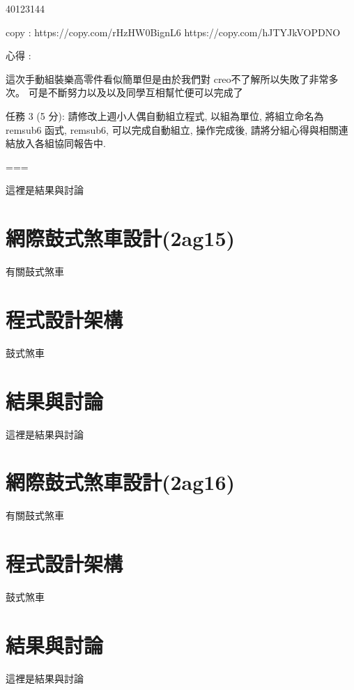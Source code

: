 \documentclass[]{article}
\begin{document}
40123144

copy : https://copy.com/rHzHW0BignL6 https://copy.com/hJTYJkVOPDNO

心得 :

這次手動組裝樂高零件看似簡單但是由於我們對
creo不了解所以失敗了非常多次。
可是不斷努力以及以及同學互相幫忙便可以完成了

任務 3 (5 分): 請修改上週小人偶自動組立程式, 以組為單位, 將組立命名為
remsub6 函式, remsub6, 可以完成自動組立, 操作完成後,
請將分組心得與相關連結放入各組協同報告中.

===

這裡是結果與討論

\section{網際鼓式煞車設計(2ag15)}\label{ux7db2ux969bux9f13ux5f0fux715eux8ecaux8a2dux8a082ag15}

有關鼓式煞車

\section{程式設計架構}\label{ux7a0bux5f0fux8a2dux8a08ux67b6ux69cb-3}

鼓式煞車

\section{結果與討論}\label{ux7d50ux679cux8207ux8a0eux8ad6-3}

這裡是結果與討論

\section{網際鼓式煞車設計(2ag16)}\label{ux7db2ux969bux9f13ux5f0fux715eux8ecaux8a2dux8a082ag16}

有關鼓式煞車

\section{程式設計架構}\label{ux7a0bux5f0fux8a2dux8a08ux67b6ux69cb-4}

鼓式煞車

\section{結果與討論}\label{ux7d50ux679cux8207ux8a0eux8ad6-4}

這裡是結果與討論
\end{document}
